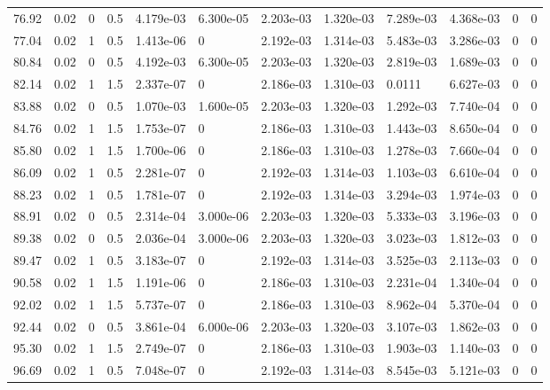 \documentclass[preview]{standalone}
\begin{document}
{{{\begin{tabular}{L{1.2cm}C{1.2cm} C{0.3cm}C{0.5cm} C{1.4cm}C{1.4cm} C{1.4cm}C{1.4cm} C{1.6cm}C{1.6cm} C{1.6cm}C{1.6cm}}
  76.92  &  0.02  & 0     & 0.5 &  4.179e-03  & 6.300e-05  &  2.203e-03&   1.320e-03& 7.289e-03 & 4.368e-03   &  0 & 0  \\ 
  77.04  &  0.02  & 1     & 0.5 &  1.413e-06  & 0  &  2.192e-03&   1.314e-03& 5.483e-03 & 3.286e-03   &  0 & 0  \\ 
  80.84  &  0.02  & 0     & 0.5 &  4.192e-03  & 6.300e-05  &  2.203e-03&   1.320e-03& 2.819e-03 & 1.689e-03   &  0 & 0  \\ 
  82.14  &  0.02  & 1     & 1.5 &  2.337e-07  & 0  &  2.186e-03&   1.310e-03& 0.0111 & 6.627e-03   &  0 & 0  \\ 
  83.88  &  0.02  & 0     & 0.5 &  1.070e-03  & 1.600e-05  &  2.203e-03&   1.320e-03& 1.292e-03 & 7.740e-04   &  0 & 0  \\ 
  84.76  &  0.02  & 1     & 1.5 &  1.753e-07  & 0  &  2.186e-03&   1.310e-03& 1.443e-03 & 8.650e-04   &  0 & 0  \\ 
  85.80  &  0.02  & 1     & 1.5 &  1.700e-06  & 0  &  2.186e-03&   1.310e-03& 1.278e-03 & 7.660e-04   &  0 & 0  \\ 
  86.09  &  0.02  & 1     & 0.5 &  2.281e-07  & 0  &  2.192e-03&   1.314e-03& 1.103e-03 & 6.610e-04   &  0 & 0  \\ 
  88.23  &  0.02  & 1     & 0.5 &  1.781e-07  & 0  &  2.192e-03&   1.314e-03& 3.294e-03 & 1.974e-03   &  0 & 0  \\ 
  88.91  &  0.02  & 0     & 0.5 &  2.314e-04  & 3.000e-06  &  2.203e-03&   1.320e-03& 5.333e-03 & 3.196e-03   &  0 & 0  \\ 
  89.38  &  0.02  & 0     & 0.5 &  2.036e-04  & 3.000e-06  &  2.203e-03&   1.320e-03& 3.023e-03 & 1.812e-03   &  0 & 0  \\ 
  89.47  &  0.02  & 1     & 0.5 &  3.183e-07  & 0  &  2.192e-03&   1.314e-03& 3.525e-03 & 2.113e-03   &  0 & 0  \\ 
  90.58  &  0.02  & 1     & 1.5 &  1.191e-06  & 0  &  2.186e-03&   1.310e-03& 2.231e-04 & 1.340e-04   &  0 & 0  \\ 
  92.02  &  0.02  & 1     & 1.5 &  5.737e-07  & 0  &  2.186e-03&   1.310e-03& 8.962e-04 & 5.370e-04   &  0 & 0  \\ 
  92.44  &  0.02  & 0     & 0.5 &  3.861e-04  & 6.000e-06  &  2.203e-03&   1.320e-03& 3.107e-03 & 1.862e-03   &  0 & 0  \\ 
  95.30  &  0.02  & 1     & 1.5 &  2.749e-07  & 0  &  2.186e-03&   1.310e-03& 1.903e-03 & 1.140e-03   &  0 & 0  \\ 
  96.69  &  0.02  & 1     & 0.5 &  7.048e-07  & 0  &  2.192e-03&   1.314e-03& 8.545e-03 & 5.121e-03   &  0 & 0  \\ 

\end{tabular}}}}
\end{document}
